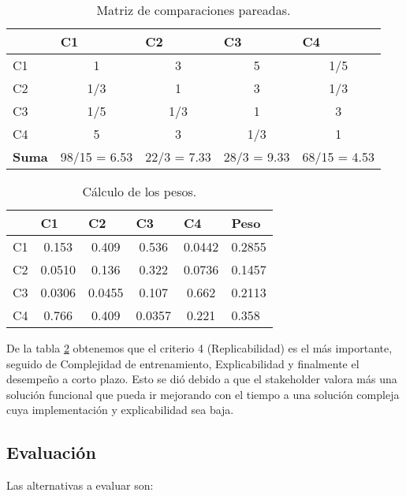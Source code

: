 \begin{table}[H]
  \centering
  \caption{Matriz de comparaciones pareadas.}
  \begin{tabular}{l|cccc}
  \hline
  \textbf{}     & \multicolumn{1}{l}{C1} & \multicolumn{1}{l}{C2} & \multicolumn{1}{l}{C3} & \multicolumn{1}{l}{C4} \\ \hline
  C1 & 1   & 3   & 5   & 1/5 \\
  C2 & 1/3 & 1   & 3   & 1/3 \\
  C3 & 1/5 & 1/3 & 1   & 3   \\
  C4 & 5   & 3   & 1/3 & 1   \\ \hline
  \textbf{Suma} & 98/15 = 6.53           & 22/3 = 7.33            & 28/3 = 9.33            & 68/15 = 4.53           \\ \hline
  \end{tabular}
  \label{tab:comp_pareadas}
\end{table}

\begin{table}[H]
  \centering
  \caption{Cálculo de los pesos.}
  \begin{tabular}{l|cccc|l}
  \hline
  \textbf{} & \multicolumn{1}{l}{C1} & \multicolumn{1}{l}{C2} & \multicolumn{1}{l}{C3} & \multicolumn{1}{l|}{C4} & \textbf{Peso} \\ \hline
  C1 & 0.153  & 0.409  & 0.536  & 0.0442 & 0.2855 \\
  C2 & 0.0510 & 0.136  & 0.322  & 0.0736 & 0.1457 \\
  C3 & 0.0306 & 0.0455 & 0.107  & 0.662  & 0.2113 \\
  C4 & 0.766  & 0.409  & 0.0357 & 0.221  & 0.358  \\ \hline
  \end{tabular}
  \label{tab:comp_pareadas_norm}
\end{table}

De la tabla \ref{tab:comp_pareadas_norm} obtenemos que el criterio 4 
(Replicabilidad) es el más importante, seguido de Complejidad de entrenamiento, 
Explicabilidad y finalmente el desempeño a corto plazo. Esto se dió debido a 
que el stakeholder valora más una solución funcional que pueda ir mejorando con 
el tiempo a una solución compleja cuya implementación y explicabilidad sea 
baja.

\subsection{Evaluación}
Las alternativas a evaluar son:


